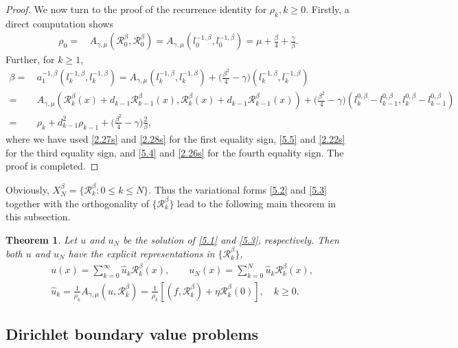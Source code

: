 \documentclass[10pt,reqno]{amsart}
\newtheorem{thm}{\bf Theorem}
\theoremstyle{remark}
\theoremstyle{definition}
\begin{document}
\begin{proof}
We now turn to the proof  of  the recurrence identity for  $\rho_k,k\ge 0$.
Firstly, a direct computation shows
\begin{align*}
  \rho_{0} = &\, A_{\gamma,\mu}(\mathcal{R}_0^{\beta}, \mathcal{R}_0^{\beta}) =  A_{\gamma,\mu}(l_0^{-1,\beta}, l_0^{-1,\beta})=
 \mu+ \frac{\beta}{4}+\frac{\gamma}{\beta}.
\end{align*}
Further, for $k\ge 1$,
\begin{align*}
  \beta = &\, a^{-1,\beta}_1(l_k^{-1,\beta}, l_k^{-1,\beta}) = A_{\gamma,\mu}(l_k^{-1,\beta}, l_k^{-1,\beta})
  + \big(\frac{\beta^2}{4}-\gamma\big) (l_k^{-1,\beta}, l_k^{-1,\beta})
  \\
  =&\, A_{\gamma,\mu}(\mathcal{R}_{k}^{\beta}(x) +  d_{k-1} \mathcal{R}_{k-1}^{\beta}(x), \mathcal{R}_{k}^{\beta}(x) +  d_{k-1} \mathcal{R}_{k-1}^{\beta}(x))
  + \big(\frac{\beta^2}{4}-\gamma\big) (l_k^{0,\beta}-l_{k-1}^{0,\beta},l_k^{0,\beta}-l_{k-1}^{0,\beta})
  \\
  =&\, \rho_k+d^2_{k-1} \rho_{k-1} +  \big(\frac{\beta^2}{4}-\gamma\big)  \frac{2}{\beta},
\end{align*}
where we have used  \eqref{2.27s} and  \eqref{2.28s} for the first equality sign,
\eqref{5.5} and \eqref{2.22s} for the third equality sign,
and \eqref{5.4} and  \eqref{2.26s} for the fourth equality sign.
The proof is completed.
\end{proof}

Obviously, 
$X^{\beta}_N=\{ \mathcal{R}^{\beta}_k :   0\le k\le N \}$.
 Thus the variational forms \eqref{5.2} and \eqref{5.3} together with
the orthogonality of $\{\mathcal{R}_{k}^{\beta}\}$
lead to the following main theorem in this subsection.

\begin{thm} Let $u$ and $u_N$ be the solution  of  \eqref{5.1}  and  \eqref{5.3}, respectively. Then
both $u$ and $u_N$ have the explicit representations in $\{\mathcal{R}^{\beta}_k\}$,
\begin{align*}
    & u(x) = \sum_{k=0}^{\infty} \hat u_k \mathcal{R}_k^{\beta}(x),  \qquad
    u_N(x) = \sum_{k=0}^{N} \hat u_k \mathcal{R}_k^{\beta}(x),
    \\
    &\hat u_k
    = \frac{1}{\rho_k} A_{\gamma,\mu}(u, \mathcal{R}_k^{\beta})
    = \frac{1}{\rho_k}  \left[ (f, \mathcal{R}_k^{\beta}) + \eta \mathcal{R}_k^{\beta}(0)\right], \quad k\ge 0.
\end{align*}
\end{thm}

\subsection{Dirichlet boundary value problems}
\end{document}
